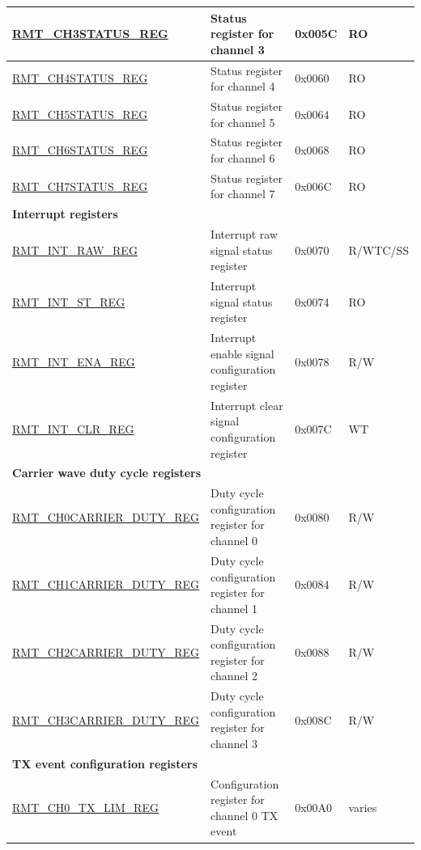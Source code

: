\begin{longtable}{ | p{5.5cm} | p{6.9cm} | p{1.3cm} | p{1.8cm} | }
\hyperref[regdesc:RMTCHNSTATUSREG]{RMT\_CH3STATUS\_REG} & Status register for channel 3 & 0x005C & RO \\ \hline
\hyperref[regdesc:RMTCHMSTATUSREG]{RMT\_CH4STATUS\_REG} & Status register for channel 4 & 0x0060 & RO \\ \hline
\hyperref[regdesc:RMTCHMSTATUSREG]{RMT\_CH5STATUS\_REG} & Status register for channel 5 & 0x0064 & RO \\ \hline
\hyperref[regdesc:RMTCHMSTATUSREG]{RMT\_CH6STATUS\_REG} & Status register for channel 6 & 0x0068 & RO \\ \hline
\hyperref[regdesc:RMTCHMSTATUSREG]{RMT\_CH7STATUS\_REG} & Status register for channel 7 & 0x006C & RO \\ \hline
\multicolumn{4}{|l|}{\textbf{Interrupt registers}} \\ \hline
\hyperref[regdesc:RMTINTRAWREG]{RMT\_INT\_RAW\_REG} & Interrupt raw signal status register & 0x0070 & R/WTC/SS \\ \hline
\hyperref[regdesc:RMTINTSTREG]{RMT\_INT\_ST\_REG} & Interrupt signal status register & 0x0074 & RO \\ \hline
\hyperref[regdesc:RMTINTENAREG]{RMT\_INT\_ENA\_REG} & Interrupt enable signal configuration register & 0x0078 & R/W \\ \hline
\hyperref[regdesc:RMTINTCLRREG]{RMT\_INT\_CLR\_REG} & Interrupt clear signal configuration register & 0x007C & WT \\ \hline
\multicolumn{4}{|l|}{\textbf{Carrier wave duty cycle registers}} \\ \hline
\hyperref[regdesc:RMTCHNCARRIERDUTYREG]{RMT\_CH0CARRIER\_DUTY\_REG} & Duty cycle configuration register for channel 0 & 0x0080 & R/W \\ \hline
\hyperref[regdesc:RMTCHNCARRIERDUTYREG]{RMT\_CH1CARRIER\_DUTY\_REG} & Duty cycle configuration register for channel 1 & 0x0084 & R/W \\ \hline
\hyperref[regdesc:RMTCHNCARRIERDUTYREG]{RMT\_CH2CARRIER\_DUTY\_REG} & Duty cycle configuration register for channel 2 & 0x0088 & R/W \\ \hline
\hyperref[regdesc:RMTCHNCARRIERDUTYREG]{RMT\_CH3CARRIER\_DUTY\_REG} & Duty cycle configuration register for channel 3 & 0x008C & R/W \\ \hline
\multicolumn{4}{|l|}{\textbf{TX event configuration registers}} \\ \hline
\hyperref[regdesc:RMTCHNTXLIMREG]{RMT\_CH0\_TX\_LIM\_REG} & Configuration register for channel 0 TX event & 0x00A0 & varies \\ \hline

\end{longtable}
